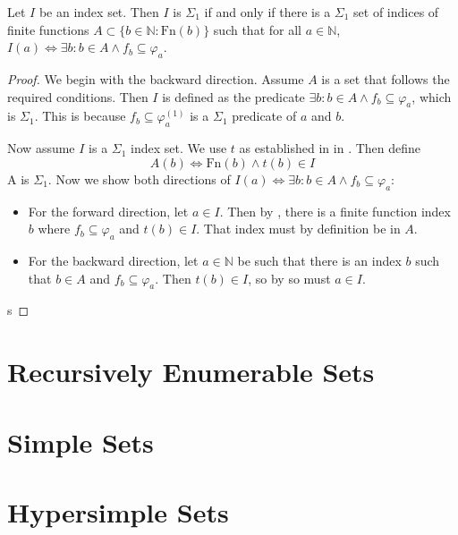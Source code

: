 \begin{theorem}
Let $I$ be an index set. Then $I$ is $\Sigma_1$ if and only if there is a $\Sigma_1$ set of indices of finite functions $A \subset \{ b \in \mathbb{N} \colon \text{Fn}(b) \}$ such that for all $a \in \mathbb{N}$, $I(a) \iff \exists b \colon b \in A \land f_b \subseteq \varphi_a$.
\end{theorem}
\begin{proof}
We begin with the backward direction. Assume $A$ is a set that follows the required conditions. Then $I$ is defined as the predicate $\exists b \colon b \in A \land f_b \subseteq \varphi_a$, which is $\Sigma_1$. This is because $f_b \subseteq \varphi_a^{(1)}$ is a $\Sigma_1$ predicate of $a$ and $b$.

Now assume $I$ is a $\Sigma_1$ index set. We use $t$ as established in in . Then define \[
    A(b) \iff \text{Fn}(b) \land t(b) \in I
\]
A is $\Sigma_1$. Now we show both directions of $I(a) \iff \exists b \colon b \in A \land f_b \subseteq \varphi_a$:
\begin{itemize}
    \item For the forward direction, let $a \in I$. Then by , there is a finite function index $b$ where $f_b \subseteq \varphi_a$ and $t(b) \in I$. That index must by definition be in $A$.
    \item For the backward direction, let $a \in \mathbb{N}$ be such that there is an index $b$ such that $b \in A$ and $f_b \subseteq \varphi_a$. Then $t(b) \in I$, so by  so must $a \in I$.
\end{itemize}s
\end{proof}

\section{Recursively Enumerable Sets}
\section{Simple Sets}
\section{Hypersimple Sets}
